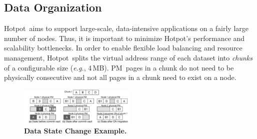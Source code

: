 \documentclass[sigconf]{acmart}
\newcommand{\DIFaddFL}[1]{}
\renewcommand{\em}{\it}
\newcommand{\mycaption}[3]{\caption{\label{#1}{\bf #2} \em\small #3}}
\newcommand{\eg}{\textit{e.g.}}
\newcommand{\MB}{\,MB}
\newcommand{\dsnvm}{DSPM}
\newcommand{\nvm}{PM}
\newcommand{\hotpot}{Hotpot}
\newcommand{\on}{ON}
\newcommand{\dirty}{dirty}
\newcommand{\committed}{committed}
\newcommand{\redundant}{redundant}
\providecommand{\DIFadd}[1]{{\protect\color{blue}\uwave{#1}}} %
\providecommand{\DIFaddbegin}{} %
\providecommand{\DIFaddend}{} %
\providecommand{\DIFdelbegin}{} %
\providecommand{\DIFdelend}{} %
\providecommand{\DIFaddFL}[1]{\DIFadd{#1}} %
\begin{document}
{\DIFdelbegin %
\DIFdelend \DIFaddbegin \subsection{Data Organization}
\DIFaddend \hotpot\ aims to support large-scale, data-intensive applications
on a fairly large number of nodes. %
Thus, it is important to minimize \hotpot's performance and scalability bottlenecks.
In order to enable flexible load balancing and resource management,
\hotpot\ splits the virtual address range of each dataset 
into {\em chunks} of a configurable size (\eg, 4\MB).
\nvm\ pages in a chunk do not need to be physically consecutive
and not all pages in a chunk need to exist on a node.

\DIFaddbegin {
\begin{figure}[th]
\centering
\begin{center}
\centerline{\includegraphics[width=0.5\textwidth]{Figures/data-eg.pdf}}
\end{center}
\mycaption{fig-data-eg}{Data State Change Example.}
{
\DIFaddFL{White, black, and striped blocks represent \committed, \redundant, and \dirty\ states.
Before commit, Node 2 and Node 3 both have cached copies of 
data page $B$. Node 2 has written to $B$ and created a \dirty\ page, $B1$.
During commit, Node 2 pushes the content $B1$ to its \on, Node 1.
Node 1 updates its \committed\ copy to $B1$ and also sends this update to Node 3.
Figure (c) shows the state after migrating the \on\ of chunk 1 from Node 1 to Node 3. 
After migration, Node 3 has all the pages of the chunk and all of them are in \committed\ states.
}}
\end{figure}
}


}
\end{document}
